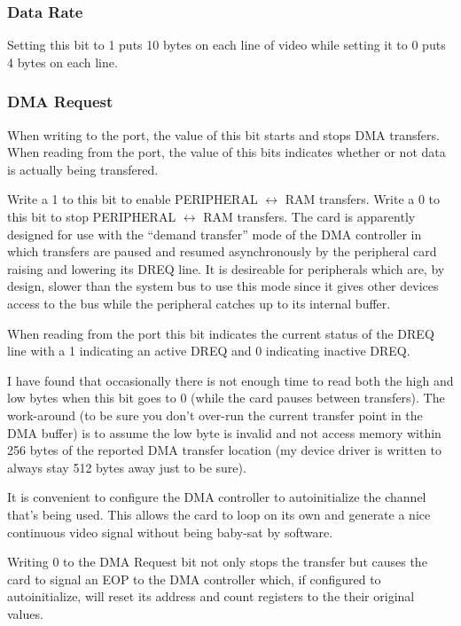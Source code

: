 \documentclass{article}
\begin{document}
\subsubsection{Data Rate}

Setting this bit to 1 puts 10 bytes on each line of video while setting it
to 0 puts 4 bytes on each line.


\subsubsection{DMA Request}

When writing to the port, the value of this bit starts and stops DMA
transfers.  When reading from the port, the value of this bits indicates
whether or not data is actually being transfered.

Write a 1 to this bit to enable PERIPHERAL \(\longleftrightarrow\) RAM
transfers. Write a 0 to this bit to stop PERIPHERAL \(\longleftrightarrow\)
RAM transfers.  The card is apparently designed for use with the ``demand
transfer'' mode of the DMA controller in which transfers are paused and
resumed asynchronously by the peripheral card raising and lowering its DREQ
line.  It is desireable for peripherals which are, by design, slower than
the system bus to use this mode since it gives other devices access to the
bus while the peripheral catches up to its internal buffer.

When reading from the port this bit indicates the current status of the
DREQ line with a 1 indicating an active DREQ and 0 indicating inactive
DREQ.

I have found that occasionally there is not enough time to read both the
high and low bytes when this bit goes to 0 (while the card pauses between
transfers).  The work-around (to be sure you don't over-run the current
transfer point in the DMA buffer) is to assume the low byte is invalid and
not access memory within 256 bytes of the reported DMA transfer location
(my device driver is written to always stay 512 bytes away just to be
sure).

It is convenient to configure the DMA controller to autoinitialize the
channel that's being used.  This allows the card to loop on its own and
generate a nice continuous video signal without being baby-sat by software.

Writing 0 to the DMA Request bit not only stops the transfer but causes the
card to signal an EOP to the DMA controller which, if configured to
autoinitialize, will reset its address and count registers to the their
original values.
\end{document}
